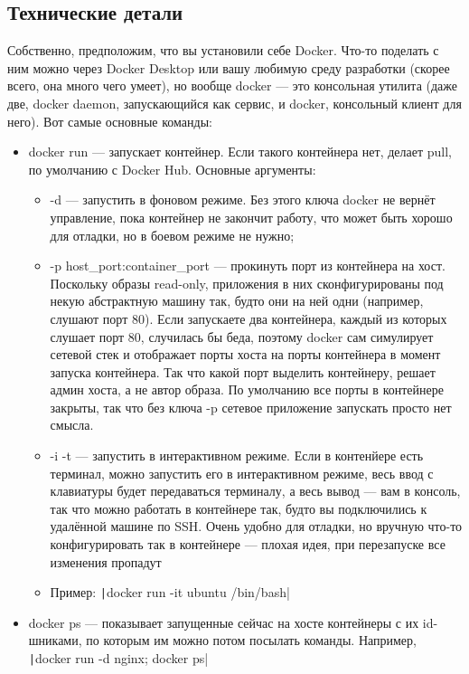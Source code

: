 \documentclass[a5paper]{article}
\begin{document}
\subsection{Технические детали}

Собственно, предположим, что вы установили себе Docker. Что-то поделать с ним можно через Docker Desktop или вашу любимую среду разработки (скорее всего, она много чего умеет), но вообще docker --- это консольная утилита (даже две, docker daemon, запускающийся как сервис, и docker, консольный клиент для него). Вот самые основные команды:

\begin{itemize}
    \item docker run --- запускает контейнер. Если такого контейнера нет, делает pull, по умолчанию с Docker Hub. Основные аргументы:
    \begin{itemize}
        \item -d --- запустить в фоновом режиме. Без этого ключа docker не вернёт управление, пока контейнер не закончит работу, что может быть хорошо для отладки, но в боевом режиме не нужно;
        \item -p host\_port:container\_port --- прокинуть порт из контейнера на хост. Поскольку образы read-only, приложения в них сконфигурированы под некую абстрактную машину так, будто они на ней одни (например, слушают порт 80). Если запускаете два контейнера, каждый из которых слушает порт 80, случилась бы беда, поэтому docker сам симулирует сетевой стек и отображает порты хоста на порты контейнера в момент запуска контейнера. Так что какой порт выделить контейнеру, решает админ хоста, а не автор образа. По умолчанию все порты в контейнере закрыты, так что без ключа -p сетевое приложение запускать просто нет смысла.
        \item -i -t --- запустить в интерактивном режиме. Если в контенйере есть терминал, можно запустить его в интерактивном режиме, весь ввод с клавиатуры будет передаваться терминалу, а весь вывод --- вам в консоль, так что можно работать в контейнере так, будто вы подключились к удалённой машине по SSH. Очень удобно для отладки, но вручную что-то конфигурировать так в контейнере --- плохая идея, при перезапуске все изменения пропадут
        \item Пример: \texttt|docker run -it ubuntu /bin/bash|
    \end{itemize}
    \item docker ps --- показывает запущенные сейчас на хосте контейнеры с их id-шниками, по которым им можно потом посылать команды. Например, \texttt|docker run -d nginx; docker ps|

\end{itemize}
\end{document}
